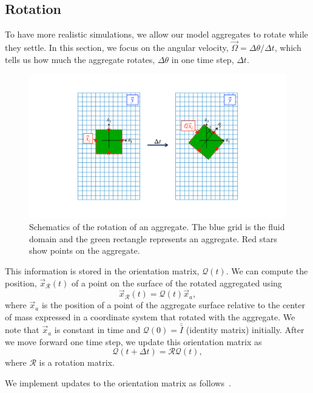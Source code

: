 \subsection{Rotation}
To have more realistic simulations, we allow our model aggregates to rotate while they settle.
In this section, we focus on the angular velocity, $\vec{\Omega} = \Delta \theta / \Delta t$, which tells us how much the aggregate rotates, $\Delta \theta$ in one time step, $\Delta t$. 
\begin{figure}[ht]
	\begin{center}
		\includegraphics[scale=0.25]{./figures/fig_rotation_schematics.pdf}
	\caption{Schematics of the rotation of an aggregate. The blue grid is the fluid domain and the green rectangle represents an aggregate. Red stars show points on the aggregate.}
	\label{fig_rotation_schematics}
\end{center}
\end{figure}
This information is stored in the orientation matrix, $\mathcal{Q}(t)$. 
We can compute the position, $\vec{x}_{\mathcal{R}}(t)$ of a point on the surface of the rotated aggregated using
\[
\vec{x}_{\mathcal{R}}(t) = \mathcal{Q}(t) \vec{x}_a,
\]
where $\vec{x}_a $ is the position of a point of the aggregate surface relative to the center of mass expressed in a coordinate system that rotated with the aggregate. We note that $\vec{x}_a$ is constant in time and $\mathcal{Q}(0) = \bar{\bar{I}}$ (identity matrix) initially. After we move forward one time step, we update this orientation matrix as 
\begin{equation}
	\mathcal{Q}(t + \Delta t) = \mathcal{R} \mathcal{Q}(t),
\end{equation} 
where $\mathcal{R}$ is a rotation matrix. 
\par
We implement updates to the orientation matrix as follows~\cite{polimeno_toward_2022}.
